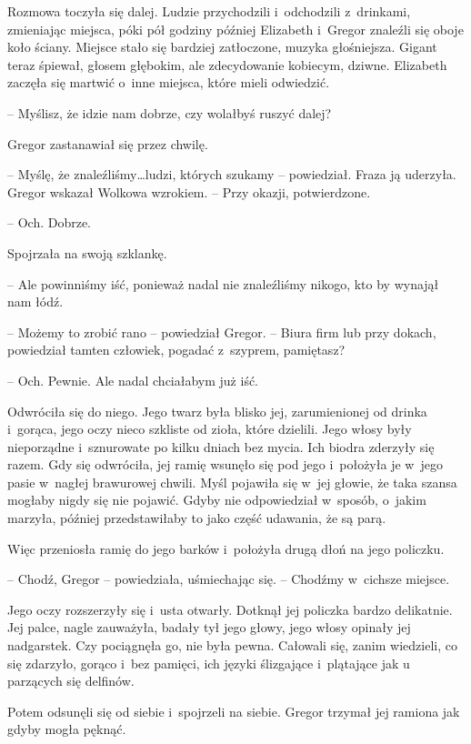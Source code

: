 \documentclass[oneside,polish,12pt,sfheadings]{mwbk}
\begin{document}
Rozmowa toczyła się dalej. Ludzie przychodzili i~odchodzili z~drinkami,
zmieniając miejsca, póki pół godziny później Elizabeth i~Gregor znaleźli
się oboje koło ściany. Miejsce stało się bardziej zatłoczone, muzyka
głośniejsza. Gigant teraz śpiewał, głosem głębokim, ale zdecydowanie
kobiecym, dziwne. Elizabeth zaczęła się martwić o~inne miejsca, które
mieli odwiedzić.

-- Myślisz, że idzie nam dobrze, czy wolałbyś ruszyć dalej?

Gregor zastanawiał się przez chwilę.

-- Myślę, że znaleźliśmy\ldots ludzi, których szukamy -- powiedział. Fraza ją
uderzyła. Gregor wskazał Wolkowa wzrokiem. -- Przy okazji, potwierdzone.

-- Och. Dobrze.

Spojrzała na swoją szklankę. 

-- Ale powinniśmy iść, ponieważ nadal nie
znaleźliśmy nikogo, kto by wynajął nam łódź.

-- Możemy to zrobić rano -- powiedział Gregor. -- Biura firm lub przy
dokach, powiedział tamten człowiek, pogadać z~szyprem, pamiętasz?

-- Och. Pewnie. Ale nadal chciałabym już iść.

Odwróciła się do niego. Jego twarz była blisko jej, zarumienionej od
drinka i~gorąca, jego oczy nieco szkliste od zioła, które dzielili. Jego
włosy były nieporządne i~sznurowate po kilku dniach bez mycia. Ich
biodra zderzyły się razem. Gdy się odwróciła, jej ramię wsunęło się pod
jego i~położyła je w~jego pasie w~nagłej brawurowej chwili. Myśl
pojawiła się w~jej głowie, że taka szansa mogłaby nigdy się nie pojawić.
Gdyby nie odpowiedział w~sposób, o~jakim marzyła, później przedstawiłaby
to jako część udawania, że są parą.

Więc przeniosła ramię do jego barków i~położyła drugą dłoń na jego
policzku.

-- Chodź, Gregor -- powiedziała, uśmiechając się. -- Chodźmy w~cichsze
miejsce.

Jego oczy rozszerzyły się i~usta otwarły. Dotknął jej policzka bardzo
delikatnie. Jej palce, nagle zauważyła, badały tył jego głowy, jego
włosy opinały jej nadgarstek. Czy pociągnęła go, nie była pewna.
Całowali się, zanim wiedzieli, co się zdarzyło, gorąco i~bez pamięci,
ich języki ślizgające i~plątające jak u parzących się delfinów.

Potem odsunęli się od siebie i~spojrzeli na siebie. Gregor trzymał jej
ramiona jak gdyby mogła pęknąć.
\end{document}
